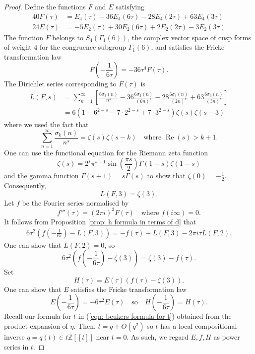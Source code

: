 \documentclass[10pt,a4paper]{amsart}
\begin{document}
\begin{proof}
Define the functions $F$ and $E$ satisfying \begin{align*}
    40F\left(\tau\right)&=E_4\left(\tau\right)-36E_4\left(6\tau\right)-28E_4\left(2\tau\right)+63E_4\left(3\tau\right)\\
    24E\left(\tau\right)&=-5E_2\left(\tau\right)+30E_2\left(6\tau\right)+2E_2\left(2\tau\right)-3E_2\left(3\tau\right)
\end{align*}
The function \(F\) belongs to \(S_4\left(\Gamma_1\left(6\right)\right)\), the complex vector space of cusp forms of weight 4 for the congruence subgroup $\Gamma_1\left(6\right)$, and satisfies the Fricke transformation law
\[F\left(-\frac{1}{6\tau}\right)=-36\tau^4F\left(\tau\right).\]
The Dirichlet series corresponding to $F\left(\tau\right)$ is \begin{align*}
L\left(F,s\right)&=\sum_{n=1}^{\infty}\left[\frac{6\sigma_3\left(n\right)}{n^s}-36\frac{6\sigma_3\left(n\right)}{\left(6n\right)^s}-28\frac{6\sigma_3\left(n\right)}{\left(2n\right)^s}+63\frac{6\sigma_3\left(n\right)}{\left(3n\right)^s}\right]\\
&=6\left(1-6^{2-s}-7\cdot 2^{2-s}+7\cdot 3^{2-s}\right)\zeta\left(s\right)\zeta\left(s-3\right)
\end{align*}
where we used the fact that \[\sum_{n=1}^{\infty}\frac{\sigma_k\left(n\right)}{n^s}=\zeta\left(s\right)\zeta\left(s-k\right)\quad\text{where }\operatorname{Re}\left(s\right)>k+1.\]
One can use the functional equation for the Riemann zeta function \[\zeta\left(s\right)=2^s\pi^{s-1}\sin \left(\frac{\pi s}{2}\right)\Gamma\left(1-s\right)\zeta\left(1-s\right)\]
and the gamma function $\Gamma\left(s+1\right)=s\Gamma\left(s\right)$ to show that $\zeta\left(0\right)=-\frac{1}{2}$. Consequently, \[L\left(F,3\right)=\zeta\left(3\right).\]
Let \(f\) be the Fourier series normalised by
\[f'''\left(\tau\right)=\left(2\pi i\right)^3F\left(\tau\right)\quad\text{where }
f\left(i\infty\right)=0.
\]
It follows from Proposition \ref{prop: h formula in terms of d} that
\begin{align}\label{eqn: transformation of f}
6\tau^2\left(f\left(-\frac{1}{6\tau}\right)-L\left(F,3\right)\right)=-f\left(\tau\right)+L\left(F,3\right)-2\pi i\tau L\left(F,2\right).
\end{align}
One can show that $L\left(F,2\right)=0$, so \[6\tau^2\left(f\left(-\frac{1}{6\tau}\right)-\zeta\left(3\right)\right)=\zeta\left(3\right)-f\left(\tau\right).\]
Set \[H\left(\tau\right)=E\left(\tau\right)\left(f\left(\tau\right)-\zeta\left(3\right)\right).\]
One can show that $E$ satisfies the Fricke transformation law \[E\left(-\frac{1}{6\tau}\right)=-6\tau^2E\left(\tau\right)\quad\text{so}\quad H\left(-\frac{1}{6\tau}\right)=H\left(\tau\right).\]
Recall our formula for $t$ in (\ref{eqn: beukers formula for t}) obtained from the product expansion of $\eta$. Then, $t=q+O\left(q^2\right)$ so $t$ has a local compositional inverse $q=q\left(t\right)\in t\mathbb{Z}\left[\left[t\right]\right]$ near $t=0$. As such, we regard $E,f,H$ as power series in $t$. 


\end{proof}
\end{document}

